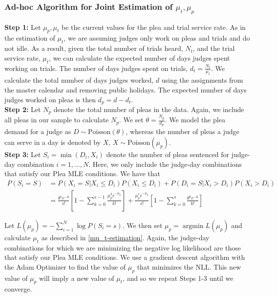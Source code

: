 \documentclass[11pt]{article}
\DeclareMathOperator*{\argmin}{argmin}
\theoremstyle{ModifiedStyle}
\begin{document}
    \subsubsection{Ad-hoc Algorithm for Joint Estimation of $\mu_t,\mu_p$}
      \textbf{Step 1:} Let $\mu_p,\mu_t$ be the current values for the plea and trial service rate. As in the estimation of $\mu_t$, we are assuming judges only work on pleas and trials and do not idle. As a result, given the total number of trials heard, $N_{t}$, and the trial service rate, $\mu_t$, we can calculate the expected number of days judges spent working on trials. The number of days judges spent on trials, $d_{t} = \frac{N_{t}}{\mu_t}$. We calculate the total number of days judges worked, $d$ using the assignments from the master calendar and removing public holidays. The expected number of days judges worked on pleas is then $d_{p} = d - d_{t}$. \\

      \noindent \textbf{Step 2:} Let $N_p$ denote the total number of pleas in the data. Again, we include all pleas in our sample to calculate $N_p$. We set $\theta = \frac{N_p}{d_p}$. We model the plea demand for a judge as $D \sim \text{Poisson}(\theta)$, whereas the number of pleas a judge can serve in a day is denoted by $X$, $X \sim \text{Poisson}(\mu_p)$. \\

      \noindent \textbf{Step 3:} Let $S_i = \min(D_i,X_i)$ denote the number of pleas sentenced for judge-day combination $i=1,...,N$. Here, we only include the judge-day combinations that satisfy our Plea MLE conditions. We have that
			\begin{align*}
				P(S_i = S) &= P(X_i = S | X_i \leq D_i) P(X_i \leq D_i) + P(D_i = S | X_i > D_i) P(X_i > D_i) \\
          &= \frac{\theta^s e^{-\theta}}{s!}[1-\sum_{k=0}^{s-1}\frac{\mu_p^k e^{-\mu_p}}{k!}] + \frac{\mu_p^s e^{-\mu_p}}{s!}[1-\sum_{k=0}^s \frac{\theta^k e^{-\theta}}{k!}]
			\end{align*}

      Let $L(\mu_p) = -\sum_{i=1}^N \log P(S_i = s)$. We then set
			 $\mu_p = \argmin L(\mu_p)$ and calculate $\mu_t$ as described in \ref{mu_t-estimation}. Again, the judge-day combinations for which we are minimizing the negative log likelihood are those that satisfy our Plea MLE conditions. We use a gradient descent algorithm with the Adam Optimizer to find the value of $\mu_p$ that minimizes the NLL. This new value of $\mu_p$ will imply a new value of $\mu_t$, and so we repeat Steps 1-3 until we converge.
\end{document}
